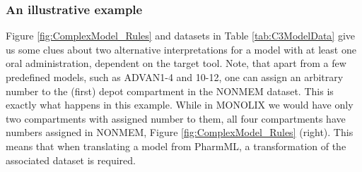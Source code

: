 %

%
%
%

\subsubsection{An illustrative example}
Figure \ref{fig:ComplexModel_Rules} and datasets in Table \ref{tab:C3ModelData} 
give us some clues about two alternative interpretations for a model with at 
least one oral administration, dependent on the target tool. Note, that apart from a
few predefined models, such as ADVAN1-4 and 10-12, one can assign an arbitrary 
number to the  (first) depot compartment in the NONMEM dataset. This is exactly what 
happens in this example. While in MONOLIX we would have only two compartments 
with assigned number to them, all four compartments have numbers assigned in NONMEM,
Figure \ref{fig:ComplexModel_Rules} (right). This means that when translating a model 
from PharmML, a transformation of the associated dataset is required. 

